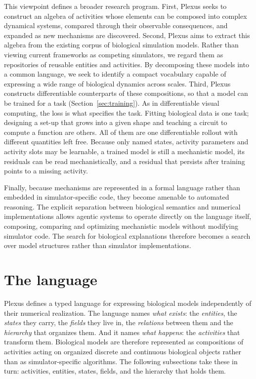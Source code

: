\documentclass[11pt]{article}
\begin{document}
This viewpoint defines a broader research program. First, Plexus seeks to construct an
algebra of activities whose elements can be composed into complex dynamical systems,
compared through their observable consequences, and expanded as new mechanisms are
discovered. Second, Plexus aims to extract this algebra from the existing corpus of
biological simulation models. Rather than viewing current frameworks as competing
simulators, we regard them as repositories of reusable entities and activities. By
decomposing these models into a common language, we seek to identify a compact
vocabulary capable of expressing a wide range of biological dynamics across scales.
Third, Plexus constructs differentiable counterparts of these compositions, so that a
model can be trained for a task (Section~\ref{sec:training}). As in differentiable
visual computing, the loss is what specifies the task. Fitting biological data is one
task; designing a set-up that grows into a given shape and teaching a circuit to compute
a function are others. All of them are one differentiable rollout with different
quantities left free. Because only named states, activity parameters and activity slots
may be learnable, a trained model is still a mechanistic model, its residuals can be read
mechanistically, and a residual that persists after training points to a missing
activity.

Finally, because mechanisms are represented in a formal language rather than embedded
in simulator-specific code, they become amenable to automated reasoning. The explicit
separation between biological semantics and numerical implementations allows agentic
systems to operate directly on the language itself, composing, comparing and
optimizing mechanistic models without modifying simulator code. The search for
biological explanations therefore becomes a search over model structures rather than
simulator implementations.

\section{The language}

Plexus defines a typed language for expressing biological models independently of
their numerical realization. The language names \emph{what exists}: the
\emph{entities}, the \emph{states} they carry, the \emph{fields} they live in, the
\emph{relations} between them and the \emph{hierarchy} that organizes them. And it
names \emph{what happens}: the \emph{activities} that transform them. Biological
models are therefore represented as compositions of activities acting on organized
discrete and continuous biological objects rather than as simulator-specific
algorithms. The following subsections take these in turn: activities, entities,
states, fields, and the hierarchy that holds them.
\end{document}
